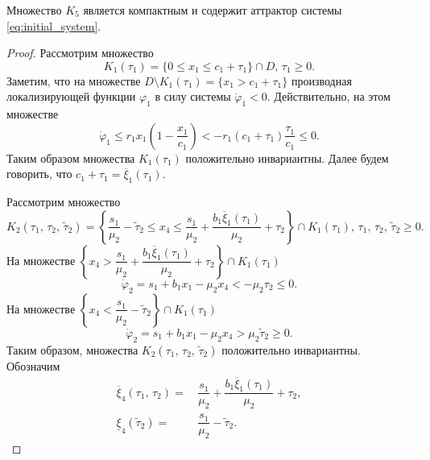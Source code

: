 \documentclass[14pt,a4paper]{extarticle}
\begin{document}
	\begin{theorem}
		Множество $K_5$ является компактным и содержит аттрактор системы \ref{eq:initial_system}.
	\end{theorem}
	\begin{proof}
		Рассмотрим множество
		\[K_1(\tau_1) = \{0 \leqslant x_1 \leqslant c_1+\tau_1\}\cap D,\, \tau_1\geqslant0.\]
		Заметим, что на множестве $D\setminus K_1(\tau_1) = \{x_1>c_1+\tau_1\}$ производная локализирующей функции $\varphi_1$ в силу системы $\dot{\varphi}_1 < 0$. Действительно, на этом множестве 
		\[\dot{\varphi}_1 \leqslant r_1x_1\left(1-\dfrac{x_1}{c_1}\right) < -r_1(c_1+\tau_1)\dfrac{\tau_1}{c_1} \leqslant 0.\]
		Таким образом множества $K_1(\tau_1)$ положительно инвариантны. Далее будем говорить, что $c_1+\tau_1=\overline{\xi}_1(\tau_1)$.
		
		Рассмотрим множество 
		\[K_2(\tau_1,\,\tau_2,\, \tilde{\tau}_2)=\left\{\dfrac{s_1}{\mu_2}-\tilde{\tau}_2 \leqslant x_4 \leqslant \dfrac{s_1}{\mu_2} + \dfrac{b_1\overline{\xi}_1(\tau_1)}{\mu_2} + \tau_2\right\}\cap K_1(\tau_1),\,\tau_1,\,\tau_2,\,\tilde{\tau}_2 \geqslant 0.\]   
		На множестве $\left\{x_4 > \dfrac{s_1}{\mu_2} + \dfrac{b_1\overline{\xi}_1(\tau_1)}{\mu_2} + \tau_2\right\}\cap K_1(\tau_1)$
		\[\dot{\varphi}_2 = s_1 + b_1x_1 - \mu_2x_4 < - \mu_2\tau_2 \leqslant 0.\]
		На множестве $\left\{x_4 < \dfrac{s_1}{\mu_2}-\tilde{\tau}_2\right\}\cap K_1(\tau_1)$
		\[\dot{\varphi}_2 = s_1 + b_1x_1 - \mu_2x_4 > \mu_2\tilde{\tau}_2 \geqslant 0.\]
		Таким образом, множества $K_2(\tau_1,\,\tau_2,\,\tilde{\tau}_2)$ положительно инвариантны. Обозначим
		\begin{align*}
			\overline{\xi}_4(\tau_1,\,\tau_2) =&\, \dfrac{s_1}{\mu_2} + \dfrac{b_1\overline{\xi}_1(\tau_1)}{\mu_2} + \tau_2,\\
			\underline{\xi}_4(\tilde{\tau}_2) =&\, \dfrac{s_1}{\mu_2} - \tilde{\tau}_2.
		\end{align*}
		

\end{proof}
\end{document}
